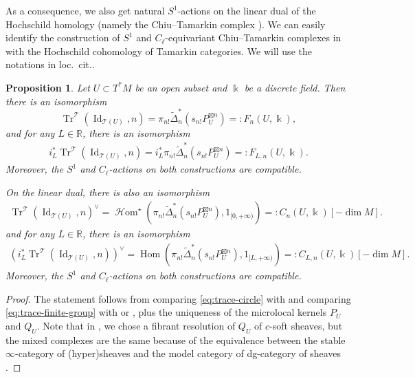 \documentclass[11pt]{amsart}
\numberwithin{equation}{section}
\theoremstyle{plain}
\newtheorem{Prop}[prop]{Proposition}
\theoremstyle{definition}
\theoremstyle{remark}
\newcommand{\bR} { {\mathbb{R}}}
\newcommand{\sT} { {\mathscr{T}}}
\newcommand{\Id}{{\operatorname{Id}}}
\newcommand\Tr{\operatorname{Tr}}
\newcommand\Hom{\operatorname{Hom}}
\newcommand\sHom{\operatorname{\mathscr{H}om}}
\begin{document}
As a consequence, we also get natural $S^1$-actions on the linear dual of the Hochschild homology (namely the Chiu--Tamarkin complex \cite{Capacities2021,CyclicZHANG}).
We can easily identify the construction of $S^1$ and $C_\ell$-equivariant Chiu--Tamarkin complexes in \cite{zhang2020quantitative,CyclicZHANG} with the Hochschild cohomology of Tamarkin categories. We will use the notations in loc.~cit..

\begin{Prop}\label{prop:iso-with-chiu-tamarkin}
    Let $U \subset T^*M$ be an open subset and $\Bbbk$ be a discrete field. Then there is an isomorphism
    \[\Tr^\sT(\Id_{\sT(U)}, n) = \pi_{n!}\widetilde{\Delta}_{n}^*(s_{n!}P_U^{\boxtimes n}) =: F_n(U, \Bbbk),\]
    and for any $L \in \bR$, there is an isomorphism
    \begin{align*}
    i_L^*\Tr^\sT(\Id_{\sT(U)}, n) = i_L^*\pi_{n!}\widetilde{\Delta}_{n}^*(s_{n!}P_U^{\boxtimes n}) =: F_{L,n}(U, \Bbbk).
    \end{align*}
    Moreover, the $S^1$ and $C_\ell$-actions on both constructions are compatible.
    
    On the linear dual, there is also an isomorphism
    \begin{align*}
    \Tr^\sT(\Id_{\sT(U)}, n)^\vee = \sHom^\star(\pi_{n!}\widetilde{\Delta}_{n}^*(s_{n!}P_U^{\boxtimes n}), 1_{[0,+\infty)}) =: C_{n}(U, \Bbbk)[-\dim M].
    \end{align*}
    and for any $L \in \bR$, there is an isomorphism
    \begin{align*}
    \left(i_L^*\Tr^\sT(\Id_{\sT(U)}, n)\right)^\vee = \Hom(\pi_{n!}\widetilde{\Delta}_{n}^*(s_{n!}P_U^{\boxtimes n}), 1_{[L,+\infty)}) =: C_{L,n}(U, \Bbbk)[-\dim M].
    \end{align*}
    Moreover, the $S^1$ and $C_\ell$-actions on both constructions are compatible.
\end{Prop}
\begin{proof}
    The statement follows from comparing \autoref{eq:trace-circle} with \cite[Equation~(3.10)]{CyclicZHANG} and comparing \autoref{eq:trace-finite-group} with \cite[Equation~(2.1)]{CyclicZHANG} or \cite[Def.~2.13]{zhang2020quantitative}, plus the uniqueness of the microlocal kernels $P_U$ and $Q_U$. Note that in \cite[Section~3]{CyclicZHANG}, we chose a fibrant resolution of $Q_U$ of $c$-soft sheaves, but the mixed complexes are the same because of the equivalence between the stable $\infty$-category of (hyper)sheaves and the model category of dg-category of sheaves \cite{Cohn-dg}.
\end{proof}
\end{document}
